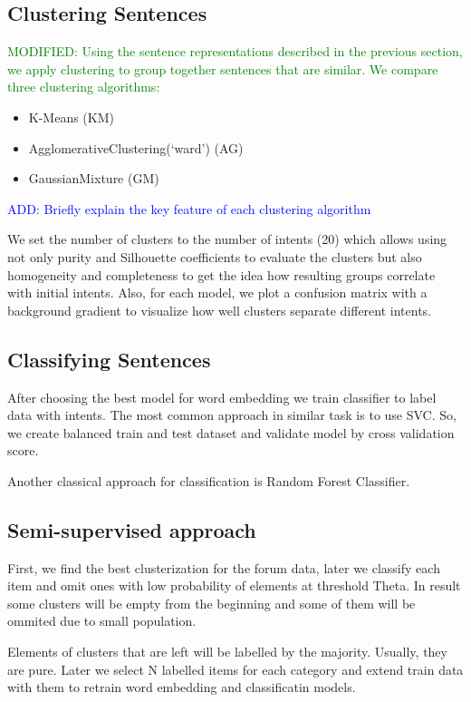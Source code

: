 \documentclass[11pt]{article}
\newcommand\add[1]{{\textcolor{blue}{ADD: #1}}}
\newcommand\mod[1]{{\textcolor{green}{MODIFIED: #1}}}
\begin{document}
\subsection{Clustering Sentences}

\mod{Using the sentence representations described in the previous
  section, we apply clustering to group together sentences that are
  similar. We compare three clustering algorithms:}

\begin{itemize}
\item K-Means (KM)
\item AgglomerativeClustering(‘ward’) (AG)
\item GaussianMixture (GM)
\end{itemize}

\add{Briefly explain the key feature of each clustering algorithm}

We set the number of clusters to the number of intents (20)
which allows using not only purity and Silhouette coefficients to
evaluate the clusters but also homogeneity and completeness to get the
idea how resulting groups correlate with initial intents. Also, for
each model, we plot a confusion matrix with a background gradient
to visualize how well clusters separate different intents.

\subsection{Classifying Sentences}

After choosing the best model for word embedding we train classifier to 
label data with intents. The most common approach in similar task is to use
SVC. So, we create balanced train and test dataset and validate model by 
cross validation score.

Another classical approach for classification is Random Forest Classifier.


\subsection{Semi-supervised approach}

First, we find the best clusterization for the forum data, later we classify each item and omit ones with low probability of elements at threshold Theta. In result some clusters will be empty from the beginning and some of them will be ommited due to small population.

Elements of clusters that are left will be labelled by the majority. Usually, they are pure. Later we select N labelled items for each category and extend train data with them to retrain word embedding and classificatin models.
\end{document}

